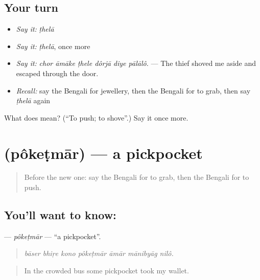 \subsection*{Your turn}
\begin{itemize}
\raggedright
  \item \emph{Say it:} \emph{ṭhelā}
  \item \emph{Say it:} \emph{ṭhelā}, once more
  \item \emph{Say it:} \emph{chor āmāke ṭhele dôrjā diye pālālô.} — The thief shoved me aside and escaped through the door.
  \item \emph{Recall:} say the Bengali for jewellery, then the Bengali for to grab, then say \emph{ṭhelā} again
\end{itemize}

\begin{tcolorbox}[breakable,colback=teal!4,colframe=teal!35!black,title={Before you move on}]
What does  mean? (\textquotedblleft{}To push; to shove\textquotedblright{}.) Say it once more.
\end{tcolorbox}
\section[\texorpdfstring{\bn{পকেটমার} (pôkeṭmār)}{পকেটমার (pôkeṭmār)}]{ (pôkeṭmār) — a pickpocket}

\label{lesson:BN-C282-poketmar}



\begin{quote}
Before the new one: say the Bengali for to grab, then the Bengali for to push.
\end{quote}

\subsection*{You'll want to know: }
\textbf{} — \emph{pôkeṭmār} — \textquotedblleft{}a pickpocket\textquotedblright{}.

\begin{quote}
      
\end{quote}

\begin{quote}
\emph{bāser bhiṛe kono pôkeṭmār āmār mānibyāg nilô.}
\end{quote}

\begin{quote}
In the crowded bus some pickpocket took my wallet.
\end{quote}


